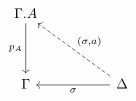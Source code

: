 \[\begin{tikzcd}
	{\Gamma.A} \\
	\\
	\Gamma && \Delta
	\arrow["{p_{A}}"', from=1-1, to=3-1]
	\arrow["\sigma", from=3-3, to=3-1]
	\arrow["{(\sigma,a)}"', dashed, from=3-3, to=1-1]
\end{tikzcd}\]